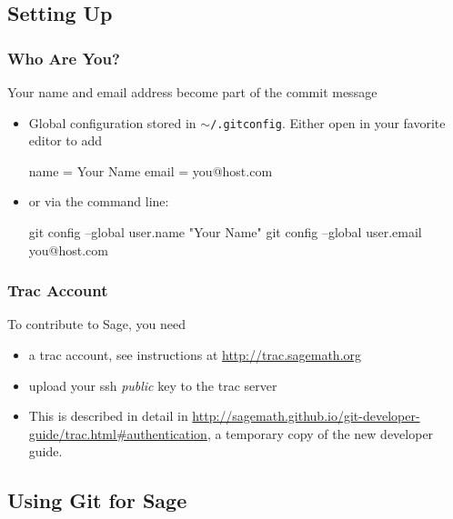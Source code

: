 \subsection{Setting Up}


\begin{frame}[fragile]
  \frametitle{Who Are You?}

  Your name and email address become part of the commit message 
  \begin{itemize}
  \item<2-> Global configuration stored in $\sim$\verb#/.gitconfig#. Either
    open in your favorite editor to add
    \begin{shell}
    [user]
        name = Your Name
        email = you@host.com
    \end{shell}
  \item<3-> or via the command line:
    \begin{shell}
git config --global user.name "Your Name"
git config --global user.email you@host.com
    \end{shell}    
  \end{itemize}

\end{frame}


\begin{frame}[fragile]
  \frametitle{Trac Account}
  
  To contribute to Sage, you need 
  \begin{itemize}
  \item<2-> a trac account, see instructions at \url{http://trac.sagemath.org}
  \item<3-> upload your ssh \emph{public} key to the trac server
  \item<4-> This is described in detail in
    \url{http://sagemath.github.io/git-developer-guide/trac.html#authentication},
    a temporary copy of the new developer guide.
  \end{itemize}
  
\end{frame}



\subsection{Using Git for Sage}


